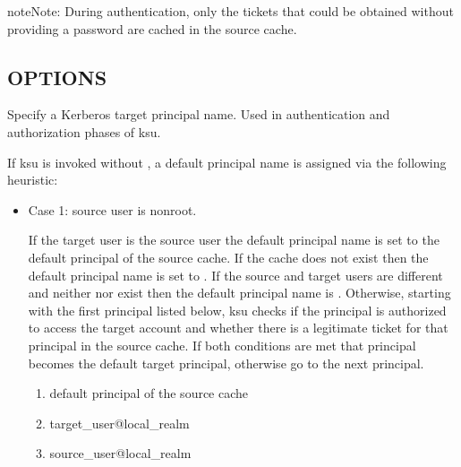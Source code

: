 \documentclass[letterpaper,10pt,english]{sphinxmanual}
\begin{document}
\begin{sphinxadmonition}{note}{Note:}
\sphinxAtStartPar
During authentication, only the tickets that could be
obtained without providing a password are cached in the
source cache.
\end{sphinxadmonition}


\subsection{OPTIONS}
\label{\detokenize{user/user_commands/ksu:options}}\begin{description}
\sphinxAtStartPar
Specify a Kerberos target principal name.  Used in authentication
and authorization phases of ksu.

\sphinxAtStartPar
If ksu is invoked without , a default principal name is
assigned via the following heuristic:
\begin{itemize}
\item {} 
\sphinxAtStartPar
Case 1: source user is non\sphinxhyphen{}root.

\sphinxAtStartPar
If the target user is the source user the default principal name
is set to the default principal of the source cache.  If the
cache does not exist then the default principal name is set to
.  If the source and target users are
different and neither  nor
 exist then the default principal name
is .  Otherwise, starting
with the first principal listed below, ksu checks if the
principal is authorized to access the target account and whether
there is a legitimate ticket for that principal in the source
cache.  If both conditions are met that principal becomes the
default target principal, otherwise go to the next principal.
\begin{enumerate}
%
\item {} 
\sphinxAtStartPar
default principal of the source cache

\item {} 
\sphinxAtStartPar
target\_user@local\_realm

\item {} 
\sphinxAtStartPar
source\_user@local\_realm


\end{enumerate}
\end{itemize}
\end{description}
\end{document}

